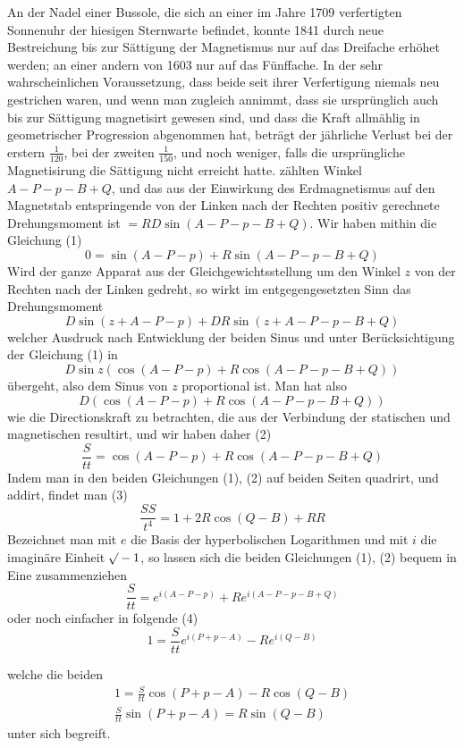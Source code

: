 \expandafter\def\csname HistoricalNoteText416\endcsname{An der Nadel einer Bussole, die sich an einer im Jahre 1709 verfertigten Sonnenuhr der hiesigen Sternwarte befindet, konnte 1841 durch neue Bestreichung bis zur Sättigung der Magnetismus nur auf das Dreifache erhöhet werden; an einer andern von 1603 nur auf das Fünffache. In der sehr wahrscheinlichen Voraussetzung, dass beide seit ihrer Verfertigung niemals neu gestrichen waren, und wenn man zugleich annimmt, dass sie ursprünglich auch bis zur Sättigung magnetisirt gewesen sind, und dass die Kraft allmählig in geometrischer Progression abgenommen hat, beträgt der jährliche Verlust bei der erstern $\frac{1}{120}$, bei der zweiten $\frac{1}{150}$, und noch weniger, falls die ursprüngliche Magnetisirung die Sättigung nicht erreicht hatte.}%
\noindent zählten Winkel $A-P-p-B+Q$, und das aus der Einwirkung des Erdmagnetismus auf den Magnetstab entspringende von der Linken nach der Rechten positiv gerechnete Drehungsmoment ist $=RD\sin(A-P-p-B+Q)$. Wir haben mithin die Gleichung (1)
\[
0=\sin(A-P-p)+R\sin(A-P-p-B+Q)
\]
Wird der ganze Apparat aus der Gleichgewichtsstellung um den Winkel $z$ von der Rechten nach der Linken gedreht, so wirkt im entgegengesetzten Sinn das Drehungsmoment
\[
D\sin(z+A-P-p)+DR\sin(z+A-P-p-B+Q)
\]
welcher Ausdruck nach Entwicklung der beiden Sinus und unter Berücksichtigung der Gleichung (1) in
\[
D\sin z(\cos(A-P-p)+R\cos(A-P-p-B+Q))
\]
übergeht, also dem Sinus von $z$ proportional ist. Man hat also
\[
D(\cos(A-P-p)+R\cos(A-P-p-B+Q))
\]
wie die Directionskraft zu betrachten, die aus der Verbindung der statischen und magnetischen resultirt, und wir haben daher (2)
\[
\frac{S}{tt}=\cos(A-P-p)+R\cos(A-P-p-B+Q)
\]
Indem man in den beiden Gleichungen (1), (2) auf beiden Seiten quadrirt, und addirt, findet man (3)
\[
\frac{SS}{t^4}=1+2R\cos(Q-B)+RR
\]
Bezeichnet man mit $e$ die Basis der hyperbolischen Logarithmen und mit $i$ die imaginäre Einheit $\mathord{{}^{}\!\surd}-1$, so lassen sich die beiden Gleichungen (1), (2) bequem in Eine zusammenziehen
\[
\frac{S}{tt}=e^{i(A-P-p)}+Re^{i(A-P-p-B+Q)}
\]
oder noch einfacher in folgende (4)
\[
1=\frac{S}{tt}e^{i(P+p-A)}-Re^{i(Q-B)}
\]
\par\clearpage
{}
\noindent welche die beiden
\[
\begin{gathered}
1=\frac{S}{tt}\cos(P+p-A)-R\cos(Q-B)\\
\frac{S}{tt}\sin(P+p-A)=R\sin(Q-B)
\end{gathered}
\]
unter sich begreift.

